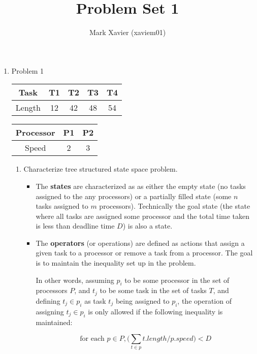 \documentclass{article}
\title{Problem Set 1}
\author{Mark Xavier (xaviem01)}
\begin{document}
	\maketitle
	
	\begin{enumerate}
		\item Problem 1
		
			\begin{center}
				\begin{tabular}{|c|c|c|c|c|}
					\hline
					Task & T1 & T2 & T3 & T4 \\
					\hline
					Length & 12 & 42 & 48 & 54 \\
					\hline
				\end{tabular}
			
				\begin{tabular}{|c|c|c|}
					\hline
					Processor & P1 & P2 \\
					\hline
					Speed & 2 & 3 \\
					\hline
				\end{tabular}
			\end{center}
		
			\begin{enumerate}
				\item Characterize tree structured state space problem.
				
				\begin{itemize}
					\item The \textbf{states} are characterized as as either the empty state (no tasks assigned to the any processors) or a partially filled state (some $n$ tasks assigned to $m$ processors).  Technically the goal state (the state where all tasks are assigned some processor and the total time taken is less than deadline time $D$) is also a state. 
					
					\item The \textbf{operators} (or operations) are defined as actions that assign a given task to a processor or remove a task from a processor.  The goal is to maintain the inequality set up in the problem.
					
					In other words, assuming $p_i$ to be some processor in the set of processors $P$, and $t_j$ to be some task in the set of tasks $T$, and defining $t_j \in p_i$ as task $t_j$ being assigned to $p_i$, the operation of assigning $t_j \in p_i$ is only allowed if the following inequality is maintained:
					
					$$\text{for each } p \in P, \bigg(\sum_{t \in p}t.length/p.speed\bigg) < D$$
					

\end{itemize}
\end{enumerate}
\end{enumerate}
\end{document}
